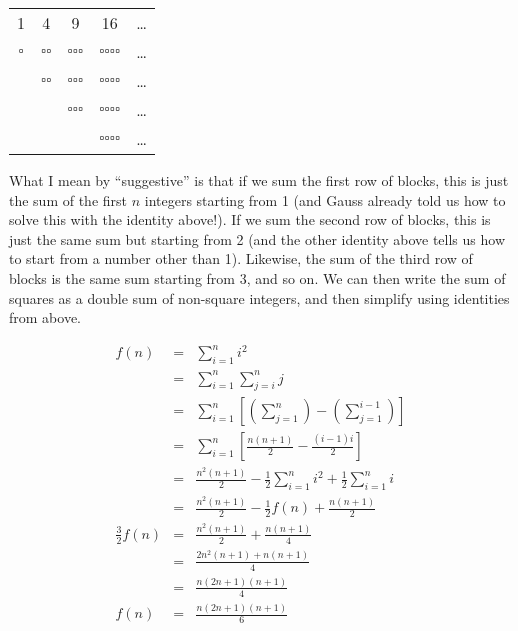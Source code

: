 \documentclass{article}[10pt,letterpaper]
\begin{document}
\begin{center}
\begin{tabular}{ccccc}
1 & 4 & 9 & 16 & \ldots\\
$\square$ & $\square$$\square$ & $\square$$\square$$\square$ & $\square$$\square$$\square$$\square$ & \ldots\\
& $\square$$\square$ & $\square$$\square$$\square$ & $\square$$\square$$\square$$\square$ & \ldots\\
& & $\square$$\square$$\square$ & $\square$$\square$$\square$$\square$ & \ldots\\
& &  & $\square$$\square$$\square$$\square$ & \ldots
\end{tabular}
\end{center}
%
What I mean by ``suggestive'' is that if we sum the first row of blocks,
this is just the sum of the first $n$ integers starting from 1
(and Gauss already told us
how to solve this with the identity above!). If we sum the second row of
blocks, this is just the same sum but starting from 2 (and the other
identity above tells us how to start from a number other than 1).
Likewise, the sum of the third row of blocks is the same sum starting from 3,
and so on.
We can then write the sum of squares as a double sum of non-square integers,
and then simplify using identities from above.

\pagebreak
\begin{eqnarray}
f(n) & = & \sum_{i=1}^n i^2\\
     & = & \sum_{i=1}^n \sum_{j=i}^n j\\
     & = & \sum_{i=1}^n \left[ \left( \sum_{j=1}^n \right) -
                               \left( \sum_{j=1}^{i-1} \right) \right]\\
     & = & \sum_{i=1}^n \left[ \frac{n(n+1)}{2} - \frac{(i-1)i}{2} \right]\\
     & = & \frac{n^2(n+1)}{2} -\frac{1}{2} \sum_{i=1}^n i^2 + \frac{1}{2} \sum_{i=1}^n i\\
     & = & \frac{n^2(n+1)}{2} -\frac{1}{2} f(n) + \frac{n(n+1)}{2}\\
\frac{3}{2}f(n) & = & \frac{n^2(n+1)}{2} + \frac{n(n+1)}{4}\\
     & = & \frac{2n^2(n+1) + n(n+1)}{4}\\
     & = & \frac{n(2n + 1)(n+1)}{4}\\
f(n) & = & \frac{n(2n + 1)(n+1)}{6}
\end{eqnarray}

\end{document}
